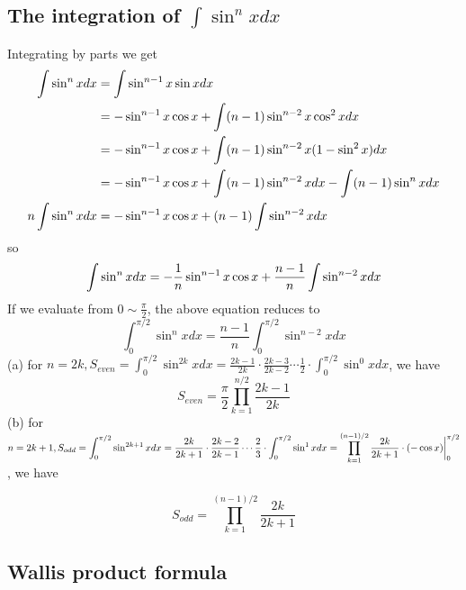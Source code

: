 \documentclass[11pt]{article}
\begin{document}
\subsection{\normalsize The integration of $ \displaystyle \int \sin ^n x dx$}

Integrating by parts we get
$$
\begin{aligned}[t]
\int \sin ^n x dx
    &= \int \sin ^{n-1} x \sin x dx\\
    &= - \sin ^{n-1} x \cos x + \int (n-1) \sin ^{n-2} x \cos ^2 x dx \\
    &= - \sin ^{n-1} x \cos x + \int (n-1) \sin ^{n-2} x (1 - \sin ^2 x)  dx \\
    &= - \sin ^{n-1} x \cos x + \int (n-1) \sin ^{n-2} x dx -  \int (n-1)  \sin ^n x  dx \\
n \int \sin ^n x dx &= - \sin ^{n-1} x \cos x + (n-1) \int \sin ^{n-2} x dx \\
\end{aligned}\\
$$
so
$$
\begin{aligned}[t]
\int \sin ^n x dx 
	&= - \frac{1}{n} \sin ^{n-1} x \cos x + \frac{n-1}{n} \int \sin ^{n-2} x dx \\
\end{aligned}\\
$$
If we evaluate from $\displaystyle 0 \sim \frac{\pi}{2}$,  the above equation reduces to
$$ \int _0 ^{\pi/2} \sin ^n x dx = \frac{n-1}{n} \int _0 ^{\pi/2} \sin ^{n-2} x dx $$
(a) for $\displaystyle n=2k,  S_{even} = \int _0 ^{\pi /2} \sin ^{2k} x dx = \frac{2k-1}{2k} \cdot \frac{2k-3}{2k-2} \cdots \frac{1}{2} \cdot \int _0 ^{\pi/2} \sin ^0 x dx $,  we have
\begin{equation}
S_{even} = \frac{\pi}{2} \prod _{k=1} ^{n/2} \frac{2k-1}{2k}
\end{equation}
(b) for $\displaystyle n=2k+1,  S_{odd} = \int _0 ^{\pi /2} \sin ^{2k+1} x dx = \frac{2k}{2k+1} \cdot \frac{2k-2}{2k-1} \cdots \frac{2}{3} \cdot \int _0 ^{\pi/2} \sin ^1 x dx \\
=  \prod _{k=1} ^{(n-1)/2} \frac{2k}{2k+1} \cdot (-\cos x) \bigg \rvert _0 ^{\pi/2} $, we have

\begin{equation}
S_{odd} = \prod _{k=1} ^{(n-1)/2} \frac{2k}{2k+1}
\end{equation}


\subsection{\normalsize Wallis product formula}
\end{document}
